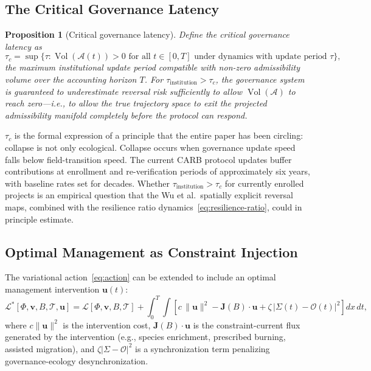 \documentclass[12pt]{article}
\newtheorem{proposition}{Proposition}
\newcommand{\Acal}{\mathcal{A}}
\newcommand{\Lcal}{\mathcal{L}}
\newcommand{\Tcal}{\mathcal{T}}
\newcommand{\vol}{\operatorname{Vol}}
\begin{document}
\subsection{The Critical Governance Latency}

\begin{proposition}[Critical governance latency]
\label{prop:tau-c}
Define the critical governance latency as
\begin{equation}
\label{eq:tau-c}
\tau_c = \sup\bigl\{\tau : \vol(\Acal(t)) > 0
\text{ for all }t\in[0,T]\text{ under dynamics with update period }\tau\bigr\},
\end{equation}
the maximum institutional update period compatible with non-zero admissibility volume
over the accounting horizon $T$. For $\tau_\text{institution} > \tau_c$, the governance
system is guaranteed to underestimate reversal risk sufficiently to allow $\vol(\Acal)$
to reach zero---i.e., to allow the true trajectory space to exit the projected admissibility
manifold completely before the protocol can respond.
\end{proposition}

$\tau_c$ is the formal expression of a principle that the entire paper has been circling:
collapse is not only ecological. Collapse occurs when governance update speed falls below
field-transition speed. The current CARB protocol updates buffer contributions at enrollment
and re-verification periods of approximately six years, with baseline rates set for decades.
Whether $\tau_\text{institution} > \tau_c$ for currently enrolled projects is an empirical
question that the Wu et al.\ spatially explicit reversal maps, combined with the resilience
ratio dynamics~\eqref{eq:resilience-ratio}, could in principle estimate.

\subsection{Optimal Management as Constraint Injection}

The variational action~\eqref{eq:action} can be extended to include an optimal management
intervention $\mathbf{u}(t)$:
\begin{equation}
\label{eq:controlled-action}
\Lcal^*[\Phi,\mathbf{v},B,\Tcal,\mathbf{u}]
= \Lcal[\Phi,\mathbf{v},B,\Tcal]
+ \int_0^T\!\!\int\left[
c\,\|\mathbf{u}\|^2 - \mathbf{J}(B)\cdot\mathbf{u}
+ \zeta\,\bigl|\Sigma(t)-\mathcal{O}(t)\bigr|^2
\right]dx\,dt,
\end{equation}
where $c\|\mathbf{u}\|^2$ is the intervention cost, $\mathbf{J}(B)\cdot\mathbf{u}$ is
the constraint-current flux generated by the intervention (e.g., species enrichment,
prescribed burning, assisted migration), and $\zeta|\Sigma-\mathcal{O}|^2$ is a
synchronization term penalizing governance-ecology desynchronization.
\end{document}
